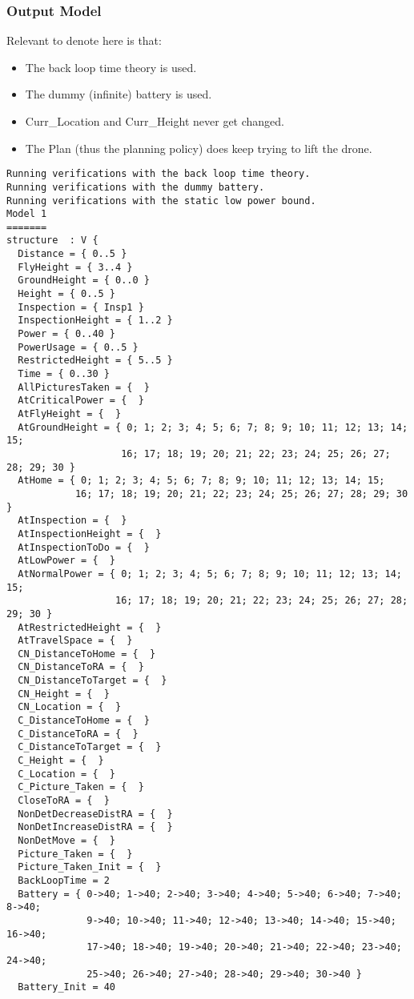 \documentclass[12pt]{extarticle}
\begin{document}
\subsubsection*{Output Model}
Relevant to denote here is that:
\begin{itemize}
    \item The back loop time theory is used.
    \item The dummy (infinite) battery is used.
    \item Curr\_Location and Curr\_Height never get changed.
    \item The Plan (thus the planning policy) does keep trying to lift the drone.
\end{itemize}
\begin{lstlisting}[basicstyle=\tiny]
Running verifications with the back loop time theory.
Running verifications with the dummy battery.
Running verifications with the static low power bound.
Model 1
=======
structure  : V {
  Distance = { 0..5 }
  FlyHeight = { 3..4 }
  GroundHeight = { 0..0 }
  Height = { 0..5 }
  Inspection = { Insp1 }
  InspectionHeight = { 1..2 }
  Power = { 0..40 }
  PowerUsage = { 0..5 }
  RestrictedHeight = { 5..5 }
  Time = { 0..30 }
  AllPicturesTaken = {  }
  AtCriticalPower = {  }
  AtFlyHeight = {  }
  AtGroundHeight = { 0; 1; 2; 3; 4; 5; 6; 7; 8; 9; 10; 11; 12; 13; 14; 15;
                    16; 17; 18; 19; 20; 21; 22; 23; 24; 25; 26; 27; 28; 29; 30 }
  AtHome = { 0; 1; 2; 3; 4; 5; 6; 7; 8; 9; 10; 11; 12; 13; 14; 15;
            16; 17; 18; 19; 20; 21; 22; 23; 24; 25; 26; 27; 28; 29; 30 }
  AtInspection = {  }
  AtInspectionHeight = {  }
  AtInspectionToDo = {  }
  AtLowPower = {  }
  AtNormalPower = { 0; 1; 2; 3; 4; 5; 6; 7; 8; 9; 10; 11; 12; 13; 14; 15;
                   16; 17; 18; 19; 20; 21; 22; 23; 24; 25; 26; 27; 28; 29; 30 }
  AtRestrictedHeight = {  }
  AtTravelSpace = {  }
  CN_DistanceToHome = {  }
  CN_DistanceToRA = {  }
  CN_DistanceToTarget = {  }
  CN_Height = {  }
  CN_Location = {  }
  C_DistanceToHome = {  }
  C_DistanceToRA = {  }
  C_DistanceToTarget = {  }
  C_Height = {  }
  C_Location = {  }
  C_Picture_Taken = {  }
  CloseToRA = {  }
  NonDetDecreaseDistRA = {  }
  NonDetIncreaseDistRA = {  }
  NonDetMove = {  }
  Picture_Taken = {  }
  Picture_Taken_Init = {  }
  BackLoopTime = 2
  Battery = { 0->40; 1->40; 2->40; 3->40; 4->40; 5->40; 6->40; 7->40; 8->40;
              9->40; 10->40; 11->40; 12->40; 13->40; 14->40; 15->40; 16->40;
              17->40; 18->40; 19->40; 20->40; 21->40; 22->40; 23->40; 24->40;
              25->40; 26->40; 27->40; 28->40; 29->40; 30->40 }
  Battery_Init = 40
  

\end{lstlisting}
\end{document}
